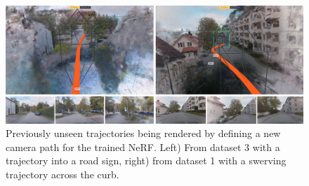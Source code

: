 \begin{figure}[h]
    \centering
    \includegraphics[width=1.0\textwidth]{figures/unseen-trajectories-real-data.png}
    \caption{Previously unseen trajectories being rendered by defining a new camera path for the trained NeRF. Left) From dataset 3 with a trajectory into a road sign, right) from dataset 1 with a swerving trajectory across the curb.}
    \label{fig:unseen-trajectories-real-data}
\end{figure}